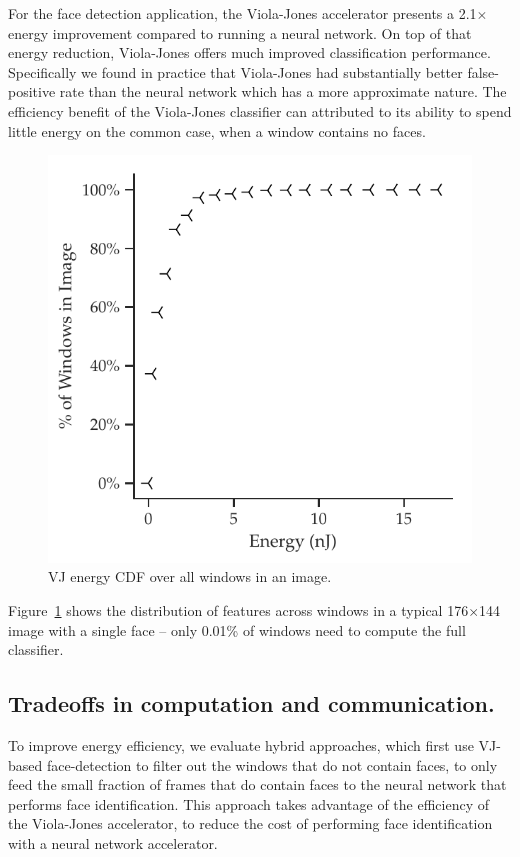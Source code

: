 For the face detection application, the Viola-Jones accelerator presents
a 2.1$\times$ energy improvement compared to running a neural network. On top of that energy reduction, Viola-Jones offers much improved classification performance.
Specifically we found in practice that Viola-Jones had substantially better
false-positive rate than the neural network which has a more approximate nature.
The efficiency benefit of the Viola-Jones classifier
can attributed to its ability to spend little energy on the common case, when a
window contains no faces.

\begin{figure}
\centering
    \begin{center}
      \includegraphics[width=\textwidth]{nsp-figs/eval_vj_cdf2.pdf}
    \end{center}
\caption{VJ energy CDF over all windows in an image.}
\label{fig:vj-cdf}
\end{figure}

Figure~\ref{fig:vj-cdf} shows the
distribution of features across windows in a typical 176$\times$144 image with a single face -- only 0.01\%
of windows need to compute the full classifier.

\subsection{Tradeoffs in computation and communication.} To improve energy efficiency, we evaluate hybrid approaches, which first use VJ-based face-detection
to filter out the windows that do not contain faces, to only feed the small fraction of frames that do contain faces to the neural network that performs face identification.
This approach takes advantage of the efficiency of the Viola-Jones accelerator, to reduce the cost of performing face identification with a neural network accelerator.


